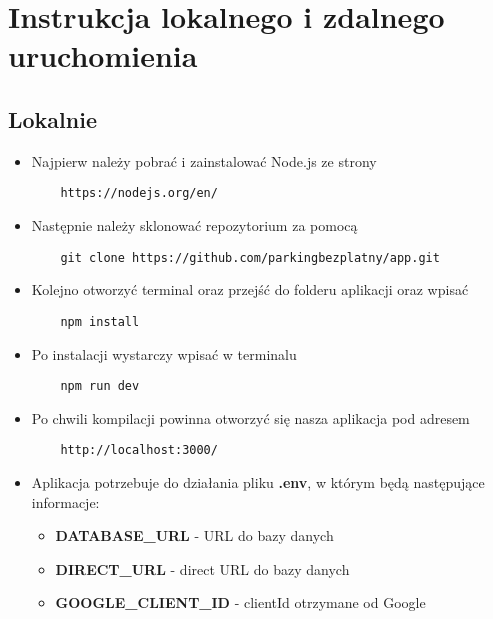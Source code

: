 \documentclass{article}
\begin{document}
    \section{Instrukcja lokalnego i zdalnego uruchomienia}
       \subsection{Lokalnie}
            \begin{itemize}
                \item Najpierw należy pobrać i zainstalować Node.js ze strony                 
                    \begin{lstlisting}
    https://nodejs.org/en/
                    \end{lstlisting}
                \item Następnie należy sklonować repozytorium za pomocą 
                    \begin{lstlisting}
    git clone https://github.com/parkingbezplatny/app.git
                    \end{lstlisting}
                \item Kolejno otworzyć terminal oraz przejść do folderu aplikacji oraz wpisać 
                    \begin{lstlisting}
    npm install              
                    \end{lstlisting}
                \item Po instalacji wystarczy wpisać w terminalu
                    \begin{lstlisting}
    npm run dev
                    \end{lstlisting} 
                \item Po chwili kompilacji powinna otworzyć się nasza aplikacja pod adresem 
                    \begin{lstlisting}
    http://localhost:3000/                        
                    \end{lstlisting}
            \item Aplikacja potrzebuje do działania pliku \textbf{.env}, w którym będą następujące informacje:
            \begin{itemize}
                \item \textbf{DATABASE\_URL} - URL do bazy danych
                \item \textbf{DIRECT\_URL} - direct URL do bazy danych
                \item \textbf{GOOGLE\_CLIENT\_ID} - clientId otrzymane od Google

\end{itemize}
\end{itemize}
\end{document}
